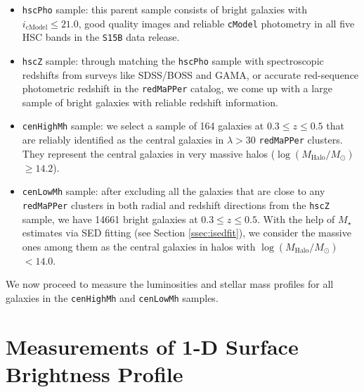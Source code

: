 \documentclass[a4paper,fleqn,usenatbib]{mnras}
\def\redm{\texttt{redMaPPer}}
\def\rbcg{\texttt{cenHighMh}}
\def\nbcg{\texttt{cenLowMh}}
\def\mstar{{$M_{\star}$}}
\def\logmh{{$\log (M_{\mathrm{Halo}}/M_{\odot})$}}
\begin{document}
    \begin{itemize}
        \item \texttt{hscPho} sample: this parent sample consists of bright galaxies 
            with $i_{\mathrm{cModel}} \leq 21.0$, good quality images and reliable 
            \texttt{cModel} photometry in all five HSC bands in the \texttt{S15B} 
            data release. 
        \item \texttt{hscZ} sample: through matching the \texttt{hscPho} sample with 
            spectroscopic redshifts from surveys like SDSS/BOSS and GAMA, or accurate 
            red-sequence photometric redshift in the \redm{} catalog, we come up with 
            a large sample of bright galaxies with reliable redshift information. 
        \item \rbcg{} sample: we select a sample of 164 galaxies at 
            $0.3 \leq z \leq 0.5$ that are reliably identified as the central galaxies 
            in $\lambda > 30$ \redm{} clusters. 
            They represent the central galaxies in very massive halos 
            (\logmh{}$\geq 14.2$). 
        \item \nbcg{} sample: after excluding all the galaxies that are close to any 
            \redm{} clusters in both radial and redshift directions from the 
            \texttt{hscZ} sample, we have 14661 bright galaxies at 
            $0.3 \leq z \leq 0.5$.
            With the help of \mstar{} estimates via SED fitting (see Section 
            \ref{ssec:isedfit}), we consider the massive ones among them as the 
            central galaxies in halos with \logmh{}$<14.0$.  
    \end{itemize}
    
    We now proceed to measure the luminosities and stellar mass profiles for 
    all galaxies in the \rbcg{} and \nbcg{} samples.

\section{Measurements of 1-D Surface Brightness Profile}
    \label{sec:ellipse}
    
\end{document}
